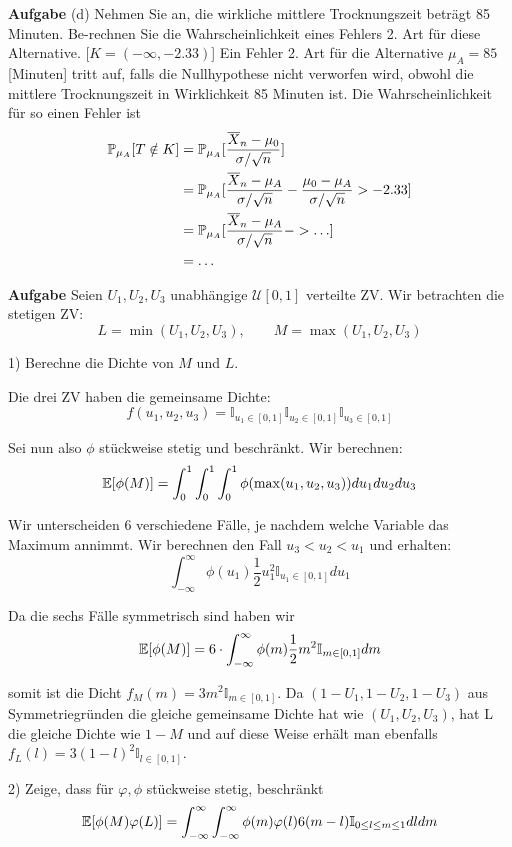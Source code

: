 \textbf{Aufgabe}
(d) Nehmen Sie an, die wirkliche mittlere Trocknungszeit beträgt 85 Minuten. Be-rechnen Sie die Wahrscheinlichkeit eines Fehlers 2. Art für diese Alternative.
[$K = (-\infty, -2.33)$]
Ein Fehler 2. Art für die Alternative $\mu_A = 85$ [Minuten] tritt auf, falls die Nullhypothese nicht verworfen wird, obwohl die mittlere Trocknungszeit in Wirklichkeit 85 Minuten ist. Die Wahrscheinlichkeit für so einen Fehler ist
\begin{align*}
	\mathbb{P}_{\mu_A}[T \notin K] & = \mathbb{P}_{\mu_A}[\frac{\overline{X}_n - \mu_0}{\sigma / \sqrt{n}}] \\
	& = \mathbb{P}_{\mu_A}[\frac{\overline{X}_n - \mu_A}{\sigma / \sqrt{n}} - \frac{\mu_0 - \mu_A}{\sigma / \sqrt{n}} > -2.33] \\
	& = \mathbb{P}_{\mu_A}[\frac{\overline{X}_n - \mu_A}{\sigma / \sqrt{n}} - > \ldots] \\
	& = \ldots
\end{align*}


\hrulefill

\textbf{Aufgabe}
Seien $U_1, U_2, U_3$ unabhängige $\mathcal U[0,1]$ verteilte ZV. Wir betrachten die stetigen ZV:
$$L = \min(U_1, U_2, U_3), \qquad M = \max(U_1, U_2, U_3)$$

1) Berechne die Dichte von $M$ und $L$.

Die drei ZV haben die gemeinsame Dichte: 
$$f(u_1, u_2, u_3) = \mathbb I_{u_1 \in [0,1]} \mathbb I_{u_2 \in [0,1]} \mathbb I_{u_3 \in [0,1]}$$

Sei nun also $\phi$ stückweise stetig und beschränkt. Wir berechnen:
$$\mathbb{E}[\phi(M)] = \int_0^1 \int_0^1 \int_0^1 \phi(\max(u_1, u_2, u_3)) du_1 du_2 du_3$$

Wir unterscheiden 6 verschiedene Fälle, je nachdem welche Variable das Maximum annimmt. Wir berechnen den Fall $u_3 < u_2 < u_1$ und erhalten:
$$\int_{-\infty}^\infty \phi(u_1) \frac{1}{2} u_1^2 \mathbb I_{u_1 \in [0,1]} du_1$$

Da die sechs Fälle symmetrisch sind haben wir
$$\mathbb{E}[\phi(M)] = 6 \cdot \int_{-\infty}^\infty \phi(m) \frac{1}{2} m^2 \mathbb I_{m \in [0,1]} dm$$

somit ist die Dicht $f_M(m) = 3m^2 \mathbb I_{m \in [0,1]}$. Da $(1 - U_1, 1- U_2,1- U_3)$ aus Symmetriegründen die gleiche gemeinsame Dichte hat wie $(U_1, U_2, U_3)$, hat L die gleiche Dichte wie $1- M$ und auf diese Weise erhält man ebenfalls $f_L(l) = 3(1 - l)^2 \mathbb I_{l \in [0,1]}$. \smallskip

2) Zeige, dass für $\varphi, \phi$ stückweise stetig, beschränkt
$$\mathbb{E}[\phi(M) \varphi(L)] = \int_{-\infty}^\infty \int_{-\infty}^\infty \phi(m) \varphi(l) 6(m-l) \mathbb I_{0 \leq l \leq m \leq 1} dldm$$

